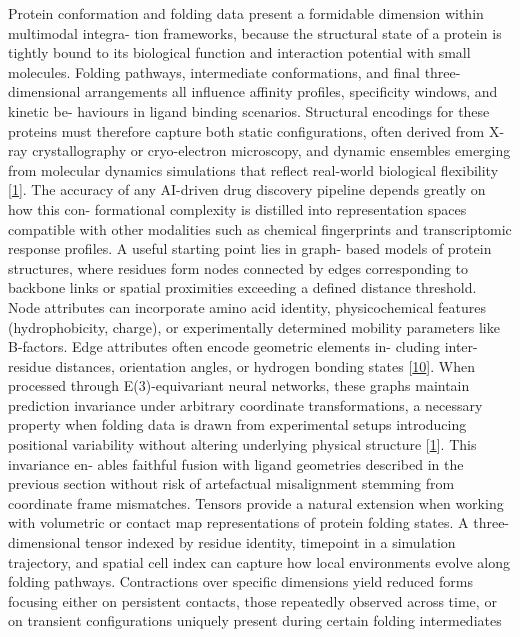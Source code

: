 \documentclass[
]{article}
\begin{document}
Protein conformation and folding data present a formidable dimension
within multimodal integra- tion frameworks, because the structural state
of a protein is tightly bound to its biological function and interaction
potential with small molecules. Folding pathways, intermediate
conformations, and final three-dimensional arrangements all influence
affinity profiles, specificity windows, and kinetic be- haviours in
ligand binding scenarios. Structural encodings for these proteins must
therefore capture both static configurations, often derived from X-ray
crystallography or cryo-electron microscopy, and dynamic ensembles
emerging from molecular dynamics simulations that reflect real-world
biological flexibility {[}\protect\hyperlink{_bookmark41}{1}{]}. The
accuracy of any AI-driven drug discovery pipeline depends greatly on how
this con- formational complexity is distilled into representation spaces
compatible with other modalities such as chemical fingerprints and
transcriptomic response profiles. A useful starting point lies in graph-
based models of protein structures, where residues form nodes connected
by edges corresponding to backbone links or spatial proximities
exceeding a defined distance threshold. Node attributes can incorporate
amino acid identity, physicochemical features (hydrophobicity, charge),
or experimentally determined mobility parameters like B-factors. Edge
attributes often encode geometric elements in- cluding inter-residue
distances, orientation angles, or hydrogen bonding states
{[}\protect\hyperlink{_bookmark50}{10}{]}. When processed through
E(3)-equivariant neural networks, these graphs maintain prediction
invariance under arbitrary coordinate transformations, a necessary
property when folding data is drawn from experimental setups introducing
positional variability without altering underlying physical structure
{[}\protect\hyperlink{_bookmark41}{1}{]}. This invariance en- ables
faithful fusion with ligand geometries described in the previous section
without risk of artefactual misalignment stemming from coordinate frame
mismatches. Tensors provide a natural extension when working with
volumetric or contact map representations of protein folding states. A
three-dimensional tensor indexed by residue identity, timepoint in a
simulation trajectory, and spatial cell index can capture how local
environments evolve along folding pathways. Contractions over specific
dimensions yield reduced forms focusing either on persistent contacts,
those repeatedly observed across time, or on transient configurations
uniquely present during certain folding intermediates
\end{document}
